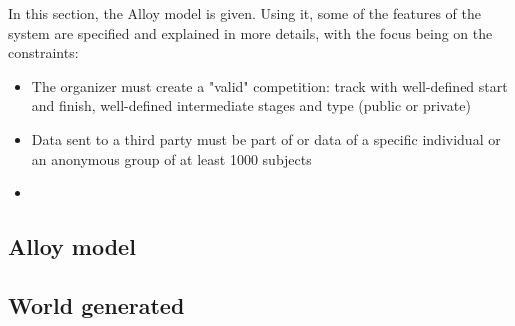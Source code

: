 
%
In this section, the Alloy model is given. Using it, some of the features of the system are specified and explained in more details, with the focus being on the constraints:
\begin{itemize}
\item The organizer must create a "valid" competition: track with well-defined start and finish, well-defined intermediate stages and type (public or private)
\item Data sent to a third party must be part of or data of a specific individual or an anonymous group of at least 1000 subjects
\item %
\end{itemize}

\subsection{Alloy model}

\clearpage
\subsection{World generated}

%